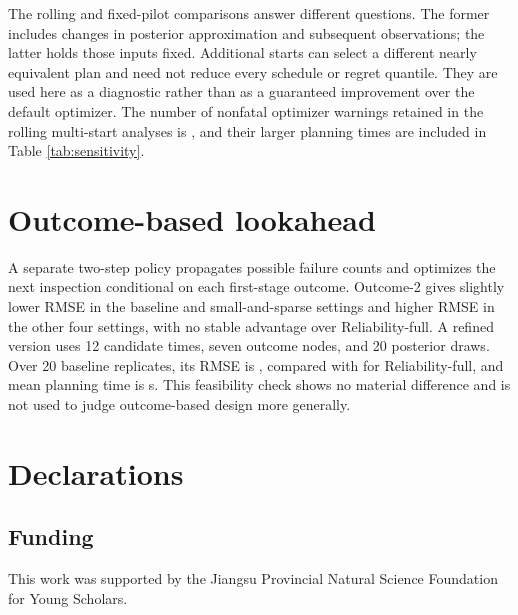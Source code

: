 \documentclass[a4paper,fleqn]{cas-sc}
\begin{document}
\begin{table}[pos=H]
\centering
\caption{Common-posterior optimization sensitivity. Regret is the bidirectional excess mean log variance defined in Section \ref{sec:commonposterior}. One start is the default and five starts include four additional random starts. Time differences below 0.001 h are numerically negligible and do not imply exact algebraic equality of all optimized inspection times.}
\label{tab:commonsensitivity}
\resizebox{\textwidth}{!}{}
\end{table}

The rolling and fixed-pilot comparisons answer different questions. The former includes changes in posterior approximation and subsequent observations; the latter holds those inputs fixed. Additional starts can select a different nearly equivalent plan and need not reduce every schedule or regret quantile. They are used here as a diagnostic rather than as a guaranteed improvement over the default optimizer. The number of nonfatal optimizer warnings retained in the rolling multi-start analyses is \MultiStartOptimizerWarnings, and their larger planning times are included in Table \ref{tab:sensitivity}.

\section{Outcome-based lookahead}
\label{app:outcome}

A separate two-step policy propagates possible failure counts and optimizes the next inspection conditional on each first-stage outcome. Outcome-2 gives slightly lower RMSE in the baseline and small-and-sparse settings and higher RMSE in the other four settings, with no stable advantage over Reliability-full. A refined version uses 12 candidate times, seven outcome nodes, and 20 posterior draws. Over 20 baseline replicates, its RMSE is \HighResolutionOutcomeRMSE, compared with \HighResolutionBatchRMSE{} for Reliability-full, and mean planning time is \HighResolutionOutcomeTime{} s. This feasibility check shows no material difference and is not used to judge outcome-based design more generally.

\section*{Declarations}

\subsection*{Funding}
This work was supported by the Jiangsu Provincial Natural Science Foundation for Young Scholars.
\end{document}
